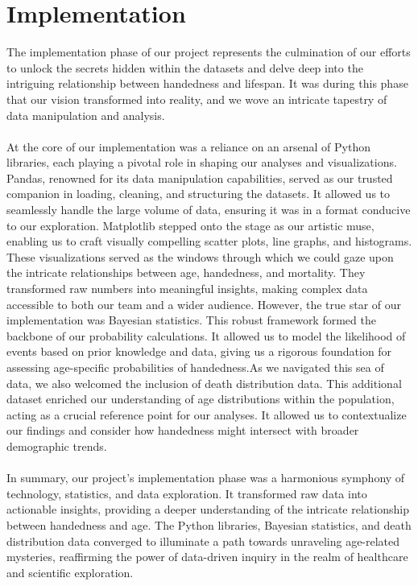 \documentclass{article}
\begin{document}
\section{Implementation}
The implementation phase of our project represents the culmination of our efforts to unlock the secrets hidden within the datasets and delve deep into the intriguing relationship between handedness and lifespan. It was during this phase that our vision transformed into reality, and we wove an intricate tapestry of data manipulation and analysis.\\ \\At the core of our implementation was a reliance on an arsenal of Python libraries, each playing a pivotal role in shaping our analyses and visualizations. Pandas, renowned for its data manipulation capabilities, served as our trusted companion in loading, cleaning, and structuring the datasets. It allowed us to seamlessly handle the large volume of data, ensuring it was in a format conducive to our exploration. Matplotlib stepped onto the stage as our artistic muse, enabling us to craft visually compelling scatter plots, line graphs, and histograms. These visualizations served as the windows through which we could gaze upon the intricate relationships between age, handedness, and mortality. They transformed raw numbers into meaningful insights, making complex data accessible to both our team and a wider audience. However, the true star of our implementation was Bayesian statistics. This robust framework formed the backbone of our probability calculations. It allowed us to model the likelihood of events based on prior knowledge and data, giving us a rigorous foundation for assessing age-specific probabilities of handedness.As we navigated this sea of data, we also welcomed the inclusion of death distribution data. This additional dataset enriched our understanding of age distributions within the population, acting as a crucial reference point for our analyses. It allowed us to contextualize our findings and consider how handedness might intersect with broader demographic trends.\\ \\In summary, our project's implementation phase was a harmonious symphony of technology, statistics, and data exploration. It transformed raw data into actionable insights, providing a deeper understanding of the intricate relationship between handedness and age. The Python libraries, Bayesian statistics, and death distribution data converged to illuminate a path towards unraveling age-related mysteries, reaffirming the power of data-driven inquiry in the realm of healthcare and scientific exploration.
\end{document}
